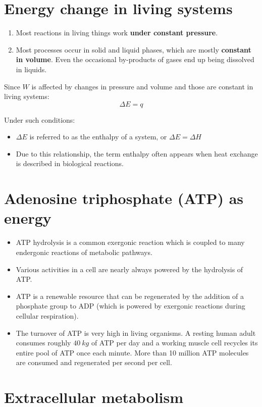 \documentclass[11pt]{article}
\begin{document}
\newpage
\section{Energy change in living systems}
\label{sec:org162b63a}
\begin{enumerate}
\item Most reactions in living things work \textbf{under constant pressure}.
\item Most processes occur in solid and liquid phases, which are mostly \textbf{constant in volume}. Even the occasional by-products of gases end up being dissolved in liquids.
\end{enumerate}

Since \(W\) is affected by changes in pressure and volume and those are constant in living systems:
\[\Delta E = q\]

Under such conditions:
\begin{itemize}
\item \(\Delta E\) is referred to as the enthalpy of a system, or \(\Delta E = \Delta H\)
\item Due to this relationship, the term enthalpy often appears when heat exchange is described in biological reactions.
\end{itemize}
\section{Adenosine triphosphate (ATP) as energy}
\label{sec:orgfc6b4ee}
\begin{itemize}
\item ATP hydrolysis is a common exergonic reaction which is coupled to many endergonic reactions of metabolic pathways.
\item Various activities in a cell are nearly always powered by the hydrolysis of ATP.
\item ATP is a renewable resource that can be regenerated by the addition of a phosphate group to ADP (which is powered by exergonic reactions during cellular respiration).
\item The turnover of ATP is very high in living organisms. A resting human adult consumes roughly \(\qty{40}{\unit{kg}}\) of ATP per day and a working muscle cell recycles its entire pool of ATP once each minute. More than 10 million ATP molecules are consumed and regenerated per second per cell.
\end{itemize}

\newpage
\section{Extracellular metabolism}
\label{sec:org42fa75e}
\end{document}
